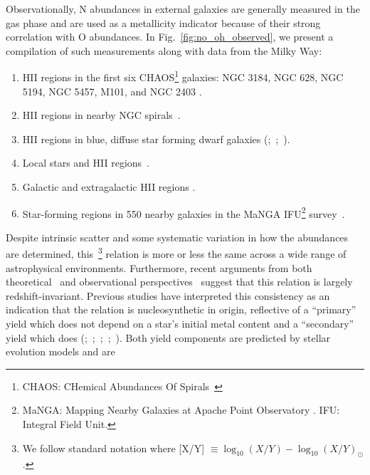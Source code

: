 \documentclass[ms.tex]{subfiles}
\begin{document}
Observationally, N abundances in external galaxies are generally measured in
the gas phase and are used as a metallicity indicator because of their strong
correlation with O abundances.
In Fig.~\ref{fig:no_oh_observed}, we present a compilation of such measurements
along with data from the Milky Way:
\begin{enumerate}
	\item[\textbf{1.}] HII regions in the first six CHAOS\footnote{
		CHAOS: CHemical Abundances Of Spirals~\citep{Berg2015}
	} galaxies: NGC 3184, NGC 628, NGC 5194, NGC 5457, M101, and NGC 2403
	\citep{Berg2020, Skillman2020, Rogers2021}.

	\item[\textbf{2.}] HII regions in nearby NGC spirals~\citep*{Pilyugin2010}.

	\item[\textbf{3.}] HII regions in blue, diffuse star forming dwarf galaxies
	(\citealp{Berg2012};~\citealp*{Izotov2012};~\citealp{James2015}).

	\item[\textbf{4.}] Local stars and HII regions~\citep{Dopita2016}.

	\item[\textbf{5.}] Galactic and extragalactic HII regions
	\citep*{Henry2000}.

	\item[\textbf{6.}] Star-forming regions in 550 nearby galaxies in the
	MaNGA IFU\footnote{
		MaNGA: Mapping Nearby Galaxies at Apache Point Observatory
		\citep{Bundy2015}.
		IFU: Integral Field Unit.
	} survey~\citep{Belfiore2017}.
\end{enumerate}
Despite intrinsic scatter and some systematic variation in how the abundances
are determined, this~\ohno\footnote{
	We follow standard notation where [X/Y]
	$\equiv \log_{10}(X/Y) - \log_{10}(X/Y)_\odot$.
} relation is more or less the same across a wide range of astrophysical
environments.
Furthermore, recent arguments from both theoretical~\citep{Vincenzo2018} and
observational perspectives~\citep{HaydenPawson2021} suggest that this relation
is largely redshift-invariant.
Previous studies have interpreted this consistency as an indication that the
relation is nucleosynthetic in origin, reflective of a ``primary'' yield which
does not depend on a star's initial metal content and a ``secondary'' yield
which does (\citealp{VilaCostas1993};~\citealp*{vanZee1998};~\citealp{Henry1999,
PerezMontero2009};~\citealp*{Pilyugin2012};~\citealp{Andrews2013}).
Both yield components are predicted by stellar evolution models and are
\end{document}
